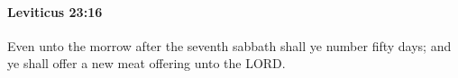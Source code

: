 
		\paragraph{Leviticus 23:16} %
			\label{LEVITICUS-23-16}

			Even unto the morrow after the seventh sabbath shall ye number fifty days; and ye shall offer a new meat offering unto the LORD.


